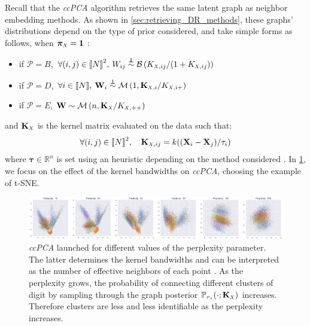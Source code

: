 Recall that the \textit{ccPCA} algorithm retrieves the same latent graph as neighbor embedding methods. As shown in \cref{sec:retrieving_DR_methods}, these graphs' distributions depend on the type of prior considered, and take simple forms as follows, when $\bm{\pi}_{\scaleto{X}{4pt}} = \bm{1}$ :
\begin{itemize}
    \item if $\mathcal{P} = B$, $\forall (i,j) \in \integ{N}^2, \: W_{ij} \stackrel{\perp\!\!\!\!\perp}{\sim} \mathcal{B}\left(K_{\scaleto{X}{4pt},ij}/(1 + K_{\scaleto{X}{4pt},ij}) \right)$
    \item if $\mathcal{P} = D$, $\forall i \in \integ{N}, \: \W_{i} \stackrel{\perp\!\!\!\!\perp}{\sim} \mathcal{M}\left(1, \mK_{\scaleto{X}{4pt},i}/K_{\scaleto{X}{4pt},i+} \right)$
    \item if $\mathcal{P} = E$, $\W \sim \mathcal{M}\left(n, \mK_{\scaleto{X}{4pt}}/ K_{\scaleto{X}{4pt},++} \right)$
\end{itemize}
and $\mK_{\scaleto{X}{4pt}}$ is the kernel matrix evaluated on the data such that:
$$\forall (i,j) \in \integ{N}^2, \quad \mK_{\scaleto{X}{4pt},ij} = k((\X_{i} - \X_{j})/\tau_{i})$$
where $\bm{\tau} \in \mathbb{R}^n$ is set using an heuristic depending on the method considered \citep{maaten2008tSNE, mcinnes2018umap, tang2016visualizing}. In \cref{fig:ccPCA_perp}, we focus on the effect of the kernel bandwidths on \textit{ccPCA}, choosing the example of t-SNE.

\begin{figure}[h]
\vskip 0.2in
\begin{center}
\centerline{\includegraphics[width=\columnwidth]{figures/GraphCoupling/multi_perp.png}}
\caption{\textit{ccPCA} launched for different values of the perplexity parameter. The latter determines the kernel bandwidths and can be interpreted as the number of effective neighbors of each point \citep{maaten2008tSNE}. As the perplexity grows, the probability of connecting different clusters of digit by sampling through the graph posterior $\mathbb{P}_{\scaleto{\mathcal{P}_X}{4pt}}(\cdot;\mK_{\scaleto{X}{4pt}})$ increases. Therefore clusters are less and less identifiable as the perplexity increases.}
\label{fig:ccPCA_perp}
\end{center}
\end{figure}

